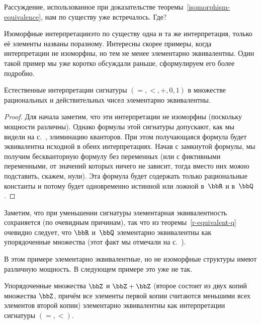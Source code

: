 \begin{problem}
Рассуждение, использованное при доказательстве
теоремы~\ref{isomorphism-equivalence}, нам по существу уже встречалось.
Где?
\end{problem}

Изоморфные интерпретации\т это по существу одна и та же
интерпретация, только её элементы названы по\д разному.
Интересны скорее
примеры, когда интерпретации не изоморфны, но
тем не менее
элементарно эквивалентны. Один такой пример мы уже коротко
обсуждали раньше, сформулируем его более подробно.

\begin{theorem}
%
        \label{r-equivalent-q}%
Естественные интерпретации сигнатуры $({=},{<},{+},0,1)$ в
множестве рациональных и действительных чисел
элементарно эквивалентны.
\end{theorem}

\begin{proof}
Для начала заметим, что эти интерпретации не изоморфны
(поскольку мощности различны). Однако формулы этой сигнатуры
допускают, как мы видели на с.~\pageref{q-plus-order-elimination},
элиминацию кванторов.%
При этом получающаяся формула будет эквивалентна исходной
в обеих интерпретациях. Начав с замкнутой формулы,
мы получим бескванторную формулу без переменных (или с
фиктивными переменными, от значений которых ничего не зависит,
тогда вместо них можно подставить, скажем, нули). Эта формула
будет содержать только рациональные константы и потому будет
одновременно истинной  или ложной в~$\bbR$ и в~$\bbQ$.
\end{proof}

Заметим, что при уменьшении сигнатуры элементарная
эквивалентность сохраняется (по очевидным причинам), так что из
теоремы~\ref{r-equivalent-q} очевидно следует, что $\bbR$ и~$\bbQ$
элементарно эквивалентны как упорядоченные множества
(этот факт мы отмечали на
с.~\pageref{dense-sets-elementary-equivalence}).

В этом примере элементарно эквивалентные, но не изоморфные
структуры имеют различную мощность. В следующем примере
это уже не так.

\begin{theorem}
        \label{z-equivalent-z-plus-z}
Упорядоченные множества $\bbZ$ и $\bbZ+\bbZ$ (второе состоит из
двух копий множества $\bbZ$, причём все элементы первой копии
считаются меньшими всех элементов второй копии) элементарно
эквивалентны как интерпретации сигнатуры $({=},{<})$.
\end{theorem}

